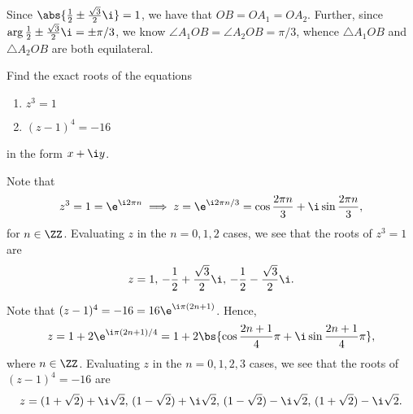 \begin{solution}
\begin{ppart}
\begin{center}
            \end{center}

            Since $\abs{\frac12 \pm \frac{\sqrt3}2 \i} = 1$, we have that $OB = OA_1 = OA_2$. Further, since $\arg{\frac12 \pm \frac{\sqrt3}2 \i} = \pm \pi/3$, we know $\angle A_1OB = \angle A_2OB = \pi/3$, whence $\triangle A_1OB$ and $\triangle A_2OB$ are both equilateral.
    \end{ppart}
\end{solution}

\begin{problem}
    Find the exact roots of the equations
    \begin{enumerate}
        \item $z^3 = 1$
        \item $(z-1)^4 = -16$
    \end{enumerate}
    in the form $x + \i y$.
\end{problem}
\begin{solution}
    \begin{ppart}
        Note that \[z^3 = 1 = \e^{\i 2\pi n} \implies z = \e^{\i 2 \pi n / 3} = \cos \frac{2\pi n}3 + \i \sin \frac{2\pi n}3,\] for $n \in \ZZ$. Evaluating $z$ in the $n = 0, 1, 2$ cases, we see that the roots of $z^3 = 1$ are \[z = 1, \, -\frac12 + \frac{\sqrt3}2 \i, \, -\frac12 - \frac{\sqrt3}2 \i.\]
    \end{ppart}
    \begin{ppart}
        Note that $(z-1)^4 = -16 = 16\e^{\i \pi (2n + 1)}$. Hence, \[z = 1 + 2\e^{\i\pi (2n + 1)/4} = 1 + 2\bs{\cos{\frac{2n+1}4 \pi} + \i\sin{\frac{2n+1}4 \pi}},\] where $n \in \ZZ$.
        Evaluating $z$ in the $n = 0, 1, 2, 3$ cases, we see that the roots of $(z-1)^4 = -16$ are \[z = (1 + \sqrt2) + \i\sqrt2, \, (1 - \sqrt2) + \i\sqrt2, \, (1 - \sqrt2) - \i\sqrt2, \, (1 + \sqrt2) - \i\sqrt2.\]
    \end{ppart}
\end{solution}

